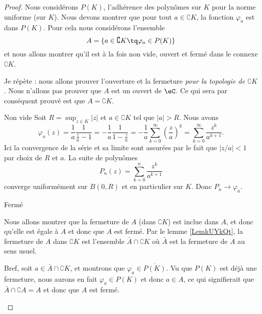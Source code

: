 \begin{proof}
    Nous considérons \( P(K)\), l'adhérence des polynômes sur \( K\) pour la norme uniforme (sur \( K\)). Nous devons montrer que pour tout \( a\in \complement K\), la fonction \( \varphi_a\) est dans \( P(K)\). Pour cela nous considérons l'ensemble
    \begin{equation}
        A=\{ a\in\complement K\tq \varphi_a\in P(K) \}
    \end{equation}
    et nous allons montrer qu'il est à la fois non vide, ouvert et fermé dans le connexe \( \complement K\).

    Je répète : nous allons prouver l'ouverture et la fermeture \emph{pour la topologie de \( \complement K\)}. Nous n'allons pas prouver que \( A\) est un ouvert de \( \eC\). Ce qui sera par conséquent prouvé est que \( A=\complement K\).

    \begin{subproof}
    \item[Non vide] Soit \( R=\sup_{z\in K}| z |\) et \( a\in \complement K\) tel que \( | a |>R\). Nous avons
        \begin{equation}
                \varphi_a(z)=\frac{1}{ a }\frac{1}{ \frac{ z }{ a }-1 }
                =-\frac{1}{ a }\frac{1}{ 1-\frac{ z }{ a } }
                =-\frac{1}{ a }\sum_{k=0}^{\infty}\left( \frac{ z }{ a } \right)^k
                =\sum_{k=0}^{\infty}\frac{ z^k }{ a^{k+1} }.
        \end{equation}
        Ici la convergence de la série et sa limite sont assurées par le fait que \( | z/a |<1\) par choix de \( R\) et \( a\). La suite de polynômes
        \begin{equation}
            P_n(z)=\sum_{k=0}^n\frac{ z^k }{ a^{k+1} }
        \end{equation}
        converge uniformément sur \( B(0,R)\) et en particulier sur \( K\). Donc \( P_n\to \varphi_a\).

    \item[Fermé] 
            
        Nous allons montrer que la fermeture de \( A\) (dans \( \complement K\)) est inclue dans \( A\), et donc qu'elle est égale à \( A\) et donc que \( A\) est fermé. Par le lemme \ref{LemkUYkQt}, la fermeture de \( A\) dans \( \complement K\) est l'ensemble \( \bar A\cap\complement K\) où \( \bar A\) est la fermeture de \( A\) au sens usuel.

        Bref, soit \( a\in \bar A\cap\complement K\), et montrons que \( \varphi_a\in \overline{ P(K) }\). Vu que \( P(K)\) est déjà une fermeture, nous aurons en fait \( \varphi_a\in P(K)\) et donc \( a\in A\), ce qui signifierait que \( \bar A\cap\complement A=A\) et donc que \( A\) est fermé.


\end{subproof}
\end{proof}
